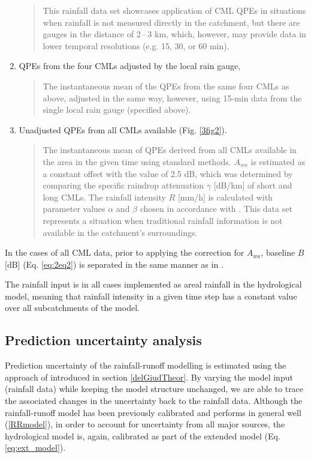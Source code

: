 \documentclass{ctuthesis}\usepackage[]{graphicx}\usepackage[]{color}
\begin{document}
\begin{enumerate}
\begin{quote}
                This rainfall data set showcases application of CML QPEs in situations when rainfall is not measured directly in the catchment, but there are gauges in the distance of 2\,--\,3 km, which, however, may provide data in lower temporal resolutions (e.g. 15, 30, or 60 min).
                \end{quote}
        \item QPEs from the four CMLs adjusted by the local rain gauge, 
                \begin{quote}
                 The instantaneous mean of the QPEs from the same four CMLs as above, adjusted in the same way, however, using 15-min data from the single local rain gauge (specified above). 
                \end{quote}
        \item Unadjusted QPEs from all CMLs available (Fig. \ref{3fig2}).
                \begin{quote}
                The instantaneous mean of QPEs derived from all CMLs available in the area in the given time using standard methods. $A_{wa}$ is estimated as a constant offset with the value of 2.5 dB, which was determined by comparing the specific raindrop attenuation $\gamma$ [dB/km] of short and long CMLs. The rainfall intensity $R$ [mm/h] is calculated with parameter values $\alpha$ and $\beta$ chosen in accordance with \cite{recommendation2005838}.
                This data set represents a situation when traditional rainfall information is not available in the catchment's surroundings.
                \end{quote}
\end{enumerate}

In the cases of all CML data, prior to applying the correction for $A_{wa}$, baseline $B$ [dB] (Eq. \ref{eq:2eq2}) is separated in the same manner as in \cite{fenclGaugeadjustedRainfallEstimates2017}.

The rainfall input is in all cases implemented as areal rainfall in the hydrological model, meaning that rainfall intensity in a given time step has a constant value over all subcatchments of the model.



\subsection{Prediction uncertainty analysis}

Prediction uncertainty of the rainfall-runoff modelling is estimated using the approach of \cite{giudice2013improving} introduced in section \ref{delGiudTheor}. By varying the model input (rainfall data) while keeping the model structure unchanged, we are able to trace the associated changes in the uncertainty back to the rainfall data. Although the rainfall-runoff model has been previously calibrated and performs in general well (\ref{RRmodel}), in order to account for uncertainty from all major sources, the hydrological model is, again, calibrated as part of the extended model (Eq. \ref{eq:ext_model}).
\end{document}
